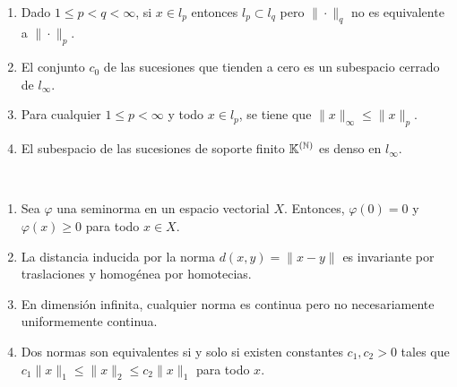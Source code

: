 \documentclass[12pt]{article}
\begin{document}
\begin{ejercicio}~
    \begin{enumerate}[label=(\alph*)]
        \item Dado $1\leq p < q < \infty$, si $x\in l_p$ entonces $l_p\subset l_q$ pero $\|\cdot \|_q$ no es equivalente a $\|\cdot\|_p$.
        \item El conjunto $c_0$ de las sucesiones que tienden a cero es un subespacio cerrado de $l_\infty$.
        \item Para cualquier $1\leq p < \infty$ y todo $x\in l_p$, se tiene que $\|x\|_\infty \leq \|x\|_p$.
        \item El subespacio de las sucesiones de soporte finito $\mathbb{K}^{(\mathbb{N})}$ es denso en $l_\infty$.
    \end{enumerate}
    
\end{ejercicio}

\begin{ejercicio}~
    \begin{enumerate}[label=(\alph*)]
        \item Sea $\varphi$ una seminorma en un espacio vectorial $X$. Entonces, $\varphi(0)=0$ y $\varphi(x)\geq 0$ para todo $x\in X$.
        \item La distancia inducida por la norma $d(x,y)=\|x-y\|$ es invariante por traslaciones y homogénea por homotecias.
        \item En dimensión infinita, cualquier norma es continua pero no necesariamente uniformemente continua.
        \item Dos normas son equivalentes si y solo si existen constantes $c_1, c_2 > 0$ tales que $c_1\|x\|_1 \leq \|x\|_2 \leq c_2\|x\|_1$ para todo $x$.
    \end{enumerate}    
\end{ejercicio}




\newpage
\setcounter{ejercicio}{0}
\end{document}
